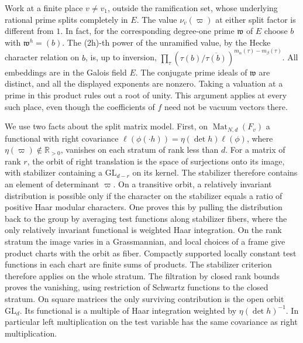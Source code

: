Work at a finite place \(v\ne v_1\), outside the ramification set,
whose underlying rational prime splits completely in \(E\). The
value \(\nu_v(\varpi)\) at either split factor is different from
\(1\). In fact, for the corresponding degree-one prime \(\mathfrak w\)
of \(E\) choose \(b\) with \(\mathfrak w^h=(b)\). The (2h)-th power
of the unramified value, by the Hecke character relation on \(b\),
is, up to inversion,
\(\prod_\tau(\tau(b)/\overline{\tau(b)})^{m_\alpha(\tau)-m_\beta(\tau)}\).
All embeddings are in the Galois field \(E\). The conjugate prime
ideals of \(\mathfrak w\) are distinct, and all the displayed
exponents are nonzero. Taking a valuation at a prime in this product
rules out a root of unity. This argument applies at every such
place, even though the coefficients of \(f\) need not be vacuum
vectors there.

We use two facts about the split matrix model. First, on
\(\operatorname{Mat}_{N,d}(F_v)\) a functional with right covariance
\(\ell(\phi(\cdot h))=\eta(\det h)\ell(\phi)\), where
\(\eta(\varpi)\notin\mathbb R_{>0}\), vanishes on each stratum of
rank less than \(d\). For a matrix of rank \(r\), the orbit of
right translation is the space of surjections onto its image, with
stabilizer containing a \(\mathrm{GL}_{d-r}\) on its kernel. The
stabilizer therefore contains an element of determinant \(\varpi\).
On a transitive orbit, a relatively invariant distribution is
possible only if the character on the stabilizer equals a ratio
of positive Haar modular characters. One proves this by pulling the
distribution back to the group by averaging test functions along
stabilizer fibers, where the only relatively invariant functional is
weighted Haar integration. On the rank stratum the image varies in
a Grassmannian, and local choices of a frame give product charts
with the orbit as fiber. Compactly supported locally constant test
functions in each chart are finite sums of products. The stabilizer
criterion therefore applies on the whole stratum. The filtration by
closed rank bounds proves the vanishing, using restriction of
Schwartz functions to the closed stratum. On square matrices the
only surviving contribution is the open orbit \(\mathrm{GL}_d\).
Its functional is a multiple of Haar integration weighted by
\(\eta(\det h)^{-1}\). In particular left multiplication on the
test variable has the same covariance as right multiplication.

